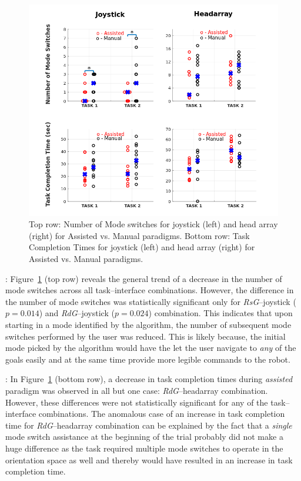 \documentclass[conference]{IEEEtran}
\begin{document}
	\begin{figure}[t]
	\centering
	\includegraphics[width = 1.1\hsize, center]{./figures/DATA_PLOT.png}
	\vspace{-0.7cm}
	\caption{Top row: Number of Mode switches for joystick (left) and head array (right) for Assisted vs. Manual paradigms. Bottom row: Task Completion Times for joystick (left) and head array (right) for Assisted vs. Manual paradigms.}
	\label{DATAPLOT}
\end{figure}
: Figure~\ref{DATAPLOT} (top row) reveals the general trend of a decrease in the number of mode switches across all task--interface combinations. However, the difference in the number of mode switches was statistically significant only for \textit{RsG}--joystick ($p\;$=$\;0.014$) and \textit{RdG}--joystick ($p\;$=$\;0.024$) combination. This indicates that upon starting in a mode identified by the algorithm, the number of subsequent mode switches performed by the user was reduced. This is likely because, the initial mode picked by the algorithm would have the let the user navigate to \textit{any} of the goals easily and at the same time provide more legible commands to the robot. 

: In Figure~\ref{DATAPLOT} (bottom row), a decrease in task completion times during \textit{assisted} paradigm was observed in all but one case: \textit{RdG}--headarray combination. However, these differences were not statistically significant for any of the task--interface combinations. The anomalous case of an increase in task completion time for \textit{RdG}--headarray combination can be explained by the fact that a \textit{single} mode switch assistance at the beginning of the trial probably did not make a huge difference as the task required multiple mode switches to operate in the orientation space as well and thereby would have resulted in an increase in task completion time.
\end{document}

